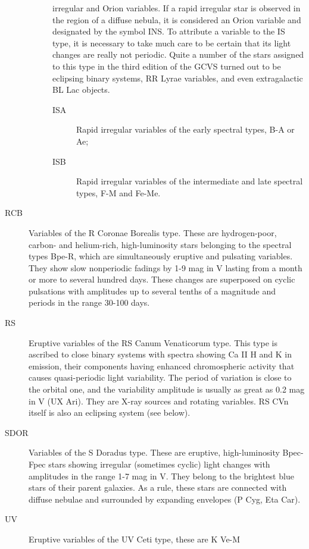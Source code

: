 \begin{description}
\begin{description}
				irregular and Orion variables. If a rapid irregular star is observed in
				the region of a diffuse nebula, it is considered an Orion variable and
				designated by the symbol INS. To attribute a variable to the IS type, it
				is necessary to take much care to be certain that its light changes are
				really not periodic. Quite a number of the stars assigned to this type
				in the third edition of the GCVS turned out to be eclipsing binary
				systems, RR Lyrae variables, and even extragalactic BL Lac
				objects.
		\begin{description}
\item[ISA]		Rapid irregular variables of the early spectral types, B-A
				or Ae;
\item[ISB]		Rapid irregular variables of the intermediate and late
				spectral types, F-M and Fe-Me.
		\end{description}
	\end{description}
\item[RCB]		Variables of the R Coronae Borealis type. These are
				hydrogen-poor, carbon- and helium-rich, high-luminosity stars belonging
				to the spectral types Bpe-R, which are simultaneously eruptive and
				pulsating variables. They show slow nonperiodic fadings by 1-9 mag in V
				lasting from a month or more to several hundred days. These changes are
				superposed on cyclic pulsations with amplitudes up to several tenths of
				a magnitude and periods in the range 30-100 days.
\item[RS]		Eruptive variables of the RS Canum Venaticorum type. This
				type is ascribed to close binary systems with spectra showing Ca II H
				and K in emission, their components having enhanced chromospheric
				activity that causes quasi-periodic light variability. The period of
				variation is close to the orbital one, and the variability amplitude is
				usually as great as 0.2 mag in V (UX Ari). They are X-ray sources and
				rotating variables. RS CVn itself is also an eclipsing system (see
				below).
\item[SDOR]		Variables of the S Doradus type. These are eruptive,
				high-luminosity Bpec-Fpec stars showing irregular (sometimes cyclic)
				light changes with amplitudes in the range 1-7 mag in V. They belong to
				the brightest blue stars of their parent galaxies. As a rule, these
				stars are connected with diffuse nebulae and surrounded by expanding
				envelopes (P Cyg, Eta Car).
\item[UV]		Eruptive variables of the UV Ceti type, these are K Ve-M

\end{description}
